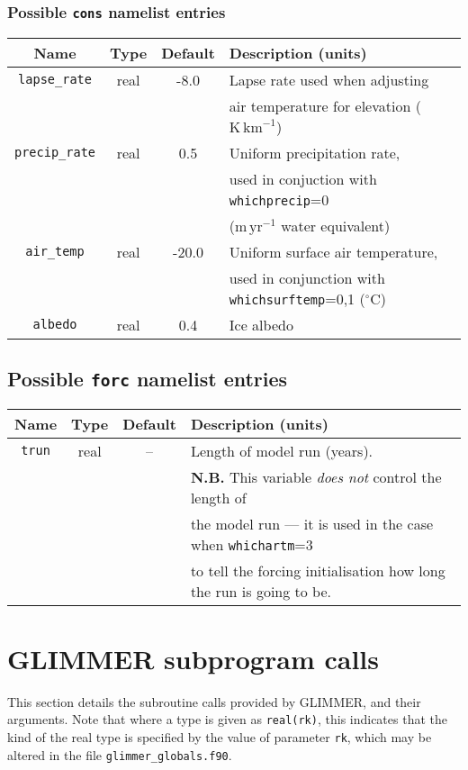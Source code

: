 \documentclass[11pt]{article}
\begin{document}
\subsubsection{Possible \texttt{cons} namelist entries}
%
\begin{center}
\begin{tabular}{|c|c|c|l|}
\hline
Name & Type & Default & Description (units)\\
\hline
\hline
\texttt{lapse\_rate} & real & -8.0 & Lapse rate used when adjusting \\
 & & & air temperature for elevation ($\mathrm{K}\,\mathrm{km}^{-1}$) \\
\hline
\texttt{precip\_rate} & real & 0.5 & Uniform precipitation rate,
\\
 & & & used in conjuction with \texttt{whichprecip}=0 \\
 & & & ($\mathrm{m}\,\mathrm{yr}^{-1}$ water equivalent) \\
\hline
\texttt{air\_temp} & real & -20.0 & Uniform surface air temperature, \\
 & & & used in conjunction with \texttt{whichsurftemp}=0,1 ($^{\circ}\mathrm{C}$) \\
\hline
\texttt{albedo} & real & 0.4 & Ice albedo \\
\hline
\end{tabular}
\end{center}
%
\subsection{Possible \texttt{forc} namelist entries}
%
\begin{center}
\begin{tabular}{|c|c|c|l|}
\hline
Name & Type & Default & Description (units)\\
\hline
\hline
\texttt{trun} & real & -- & Length of model run (years).\\
 & & & {\bf N.B.} This variable {\em does not} control the length of \\
 & & & the model run --- it is used in the case when \texttt{whichartm}=3 \\
 & & & to tell the forcing initialisation how long the run is going to be. \\
\hline
\end{tabular}
\end{center}

\section{GLIMMER subprogram calls}
%
This section details the subroutine calls provided by GLIMMER, and their
arguments. Note that where a type is given as \texttt{real(rk)}, this
indicates that the kind of the real type is specified by the value of
parameter \texttt{rk}, which may be altered in the file \texttt{glimmer\_globals.f90}.
%
\end{document}
